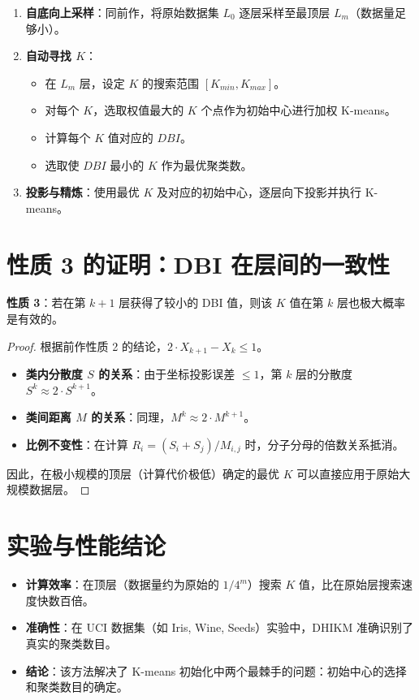 \documentclass[11pt,a4paper]{article}
\begin{document}
\begin{tcolorbox}[colback=green!5, colframe=green!40!black, title=DHIKM 算法核心步骤]
\begin{enumerate}
    \item \textbf{自底向上采样}：同前作，将原始数据集 $L_0$ 逐层采样至最顶层 $L_m$（数据量足够小）。
    \item \textbf{自动寻找 $K$}：
    \begin{itemize}
        \item 在 $L_m$ 层，设定 $K$ 的搜索范围 $[K_{min}, K_{max}]$。
        \item 对每个 $K$，选取权值最大的 $K$ 个点作为初始中心进行加权 K-means。
        \item 计算每个 $K$ 值对应的 $DBI$。
        \item 选取使 $DBI$ 最小的 $K$ 作为最优聚类数。
    \end{itemize}
    \item \textbf{投影与精炼}：使用最优 $K$ 及对应的初始中心，逐层向下投影并执行 K-means。
\end{enumerate}
\end{tcolorbox}

\section{性质 3 的证明：DBI 在层间的一致性}
\textbf{性质 3}：若在第 $k+1$ 层获得了较小的 DBI 值，则该 $K$ 值在第 $k$ 层也极大概率是有效的。

\begin{proof}
根据前作性质 2 的结论，$2 \cdot X_{k+1} - X_k \le 1$。
\begin{itemize}
    \item \textbf{类内分散度 $S$ 的关系}：由于坐标投影误差 $\le 1$，第 $k$ 层的分散度 $S^k \approx 2 \cdot S^{k+1}$。
    \item \textbf{类间距离 $M$ 的关系}：同理，$M^k \approx 2 \cdot M^{k+1}$。
    \item \textbf{比例不变性}：在计算 $R_i = (S_i + S_j)/M_{i,j}$ 时，分子分母的倍数关系抵消。
\end{itemize}
因此，在极小规模的顶层（计算代价极低）确定的最优 $K$ 可以直接应用于原始大规模数据层。
\end{proof}

\section{实验与性能结论}
\begin{itemize}
    \item \textbf{计算效率}：在顶层（数据量约为原始的 $1/4^m$）搜索 $K$ 值，比在原始层搜索速度快数百倍。
    \item \textbf{准确性}：在 UCI 数据集（如 Iris, Wine, Seeds）实验中，DHIKM 准确识别了真实的聚类数目。
    \item \textbf{结论}：该方法解决了 K-means 初始化中两个最棘手的问题：初始中心的选择和聚类数目的确定。
\end{itemize}
\end{document}
